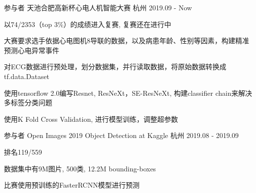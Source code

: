 

\begin{cventries}

  \cventry
    {参与者} %
    {天池合肥高新杯心电人机智能大赛} %
    {杭州} %
    {2019.09 - Now} %
    {
      \begin{cvitems} %
        \item {以74/2353（top 3\%）的成绩进入复赛, 复赛还在进行中}
        \item {大赛要求选手依据心电图机8导联的数据，以及病患年龄、性别等因素，构建精准预测心电异常事件}
        \item {对ECG数据进行预处理，划分数据集，并行读取数据，将原始数据转换成tf.data.Dataset}
        \item {使用tensorflow 2.0编写Resnet, ResNeXt，SE-ResNeXt, 构建classifier chain来解决多标签分类问题}
        \item {使用K Fold Cross Validation, 进行模型训练，调整超参数}
      \end{cvitems}
    }

  \cventry
    {参与者} %
    {Open Images 2019 Object Detection at Kaggle} %
    {杭州} %
    {2019.08 - 2019.09} %
    {
      \begin{cvitems} %
        \item {排名119/559}
        \item {数据集中有9M图片, 500类, 12.2M bounding-boxes}
        \item {比赛使用预训练的FasterRCNN模型进行预测}
      \end{cvitems}
    }


\end{cventries}
